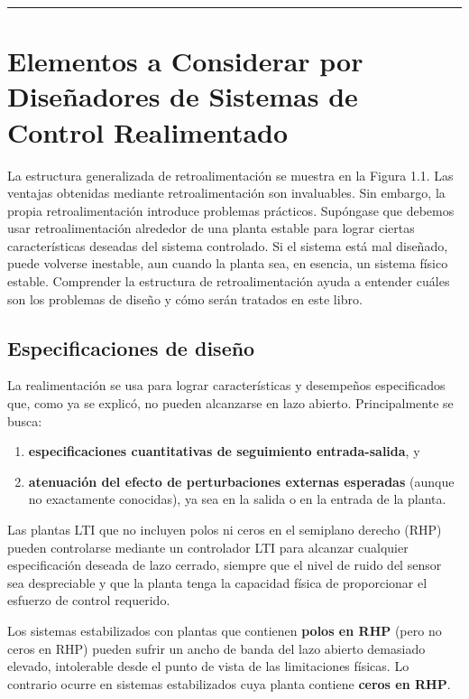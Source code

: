 \noindent\rule{\textwidth}{0.5pt}

\section{Elementos a Considerar por Diseñadores de Sistemas de Control Realimentado}
La estructura generalizada de retroalimentación se muestra en la Figura 1.1. Las ventajas obtenidas mediante retroalimentación son invaluables. Sin embargo, la propia retroalimentación introduce problemas prácticos. Supóngase que debemos usar retroalimentación alrededor de una planta estable para lograr ciertas características deseadas del sistema controlado. Si el sistema está mal diseñado, puede volverse inestable, aun cuando la planta sea, en esencia, un sistema físico estable. Comprender la estructura de retroalimentación ayuda a entender cuáles son los problemas de diseño y cómo serán tratados en este libro.

\subsection{Especificaciones de diseño}
La realimentación se usa para lograr características y desempeños especificados que, como ya se explicó, no pueden alcanzarse en lazo abierto. Principalmente se busca:

\begin{enumerate}
  \item \textbf{especificaciones cuantitativas de seguimiento entrada-salida}, y
  \item \textbf{atenuación del efecto de perturbaciones externas esperadas} (aunque no exactamente conocidas), ya sea en la salida o en la entrada de la planta.
\end{enumerate}

Las plantas LTI que no incluyen polos ni ceros en el semiplano derecho (RHP) pueden controlarse mediante un controlador LTI para alcanzar cualquier especificación deseada de lazo cerrado, siempre que el nivel de ruido del sensor sea despreciable y que la planta tenga la capacidad física de proporcionar el esfuerzo de control requerido.

Los sistemas estabilizados con plantas que contienen \textbf{polos en RHP} (pero no ceros en RHP) pueden sufrir un ancho de banda del lazo abierto demasiado elevado, intolerable desde el punto de vista de las limitaciones físicas. Lo contrario ocurre en sistemas estabilizados cuya planta contiene \textbf{ceros en RHP}.

